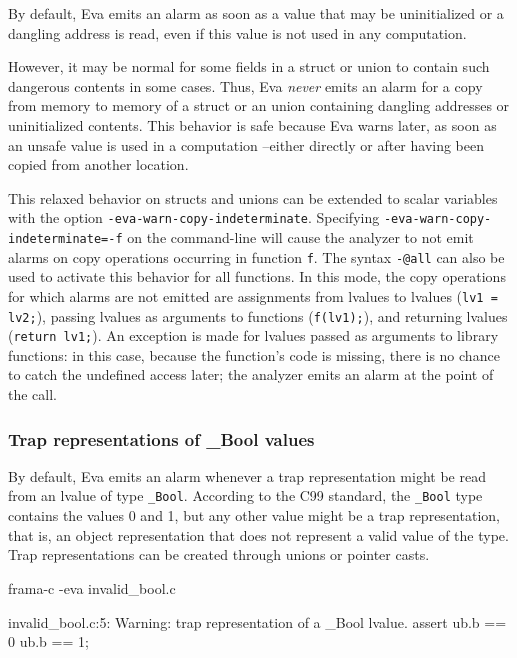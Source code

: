 \documentclass[web]{frama-c-book}
\newcommand{\isoc}{\textsf{C99}}
\newcommand{\Eva}{\textsf{Eva}}
\begin{document}
By default, \Eva{} emits an alarm as soon as a value that may be uninitialized
or a dangling address is read, even if this value is not used in any computation.

However, it may be normal for some fields in a struct or union to contain
such dangerous contents in some cases.
Thus, \Eva{} \emph{never} emits an alarm for a copy from memory to memory
of a struct or an union containing dangling addresses or uninitialized contents.
This behavior is safe because \Eva{} warns later, as soon as an unsafe value is
used in a computation --either directly or after having been copied from another
location.

This relaxed behavior on structs and unions can be extended to scalar variables
with the option \lstinline|-eva-warn-copy-indeterminate|.
Specifying \lstinline|-eva-warn-copy-indeterminate=-f| on the command-line
will cause the analyzer to not emit alarms on copy operations occurring in
function \lstinline|f|. The syntax \lstinline|-@all| can also be used to
activate this behavior for all functions.
In this mode, the copy operations for which alarms are not emitted are
assignments from lvalues to lvalues (\lstinline|lv1 = lv2;|), passing lvalues
as arguments to functions (\lstinline|f(lv1);|), and returning
lvalues (\lstinline|return lv1;|). An exception is made
for lvalues passed as arguments to library functions: in this case,
because the function's code is missing, there is no chance to catch
the undefined access later; the analyzer emits an alarm at the point
of the call.

\subsubsection{Trap representations of \_Bool values}

By default, \Eva{} emits an alarm whenever a trap representation might be read
from an lvalue of type \texttt{\_Bool}.
According to the \isoc{} standard, the \texttt{\_Bool} type contains
the values 0 and 1, but any other value might be a trap representation, that is,
an object representation that does not represent a valid value of the type.
Trap representations can be created through unions or pointer casts.

\begin{shell}
frama-c -eva invalid_bool.c
\end{shell}
\begin{logs}
   invalid_bool.c:5: Warning:
    trap representation of a _Bool lvalue. assert ub.b == 0 \/ ub.b == 1;
\end{logs}
\end{document}
